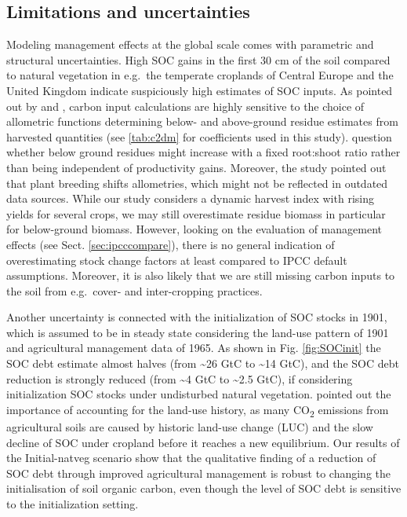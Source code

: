 \documentclass[gc, manuscript]{copernicus}
\begin{document}
\hypertarget{limitations-and-uncertainties}{%
\subsection{Limitations and uncertainties}\label{limitations-and-uncertainties}}

Modeling management effects at the global scale comes with parametric and structural uncertainties. High SOC gains in the first 30 cm of the soil compared to natural vegetation in e.g.~the temperate croplands of Central Europe and the United Kingdom indicate suspiciously high estimates of SOC inputs. As pointed out by \citep{keel_large_2017} and \citep{smith_how_2020}, carbon input calculations are highly sensitive to the choice of allometric functions determining below- and above-ground residue estimates from harvested quantities (see \ref{tab:c2dm} for coefficients used in this study). \citep{keel_large_2017} question whether below ground residues might increase with a fixed root:shoot ratio rather than being independent of productivity gains. Moreover, the study pointed out that plant breeding shifts allometries, which might not be reflected in outdated data sources. While our study considers a dynamic harvest index with rising yields for several crops, we may still overestimate residue biomass in particular for below-ground biomass. However, looking on the evaluation of management effects (see Sect. \ref{sec:ipcccompare}), there is no general indication of overestimating stock change factors at least compared to IPCC default assumptions. Moreover, it is also likely that we are still missing carbon inputs to the soil from e.g.~cover- and inter-cropping practices.

Another uncertainty is connected with the initialization of SOC stocks in 1901, which is assumed to be in steady state considering the land-use pattern of 1901 and agricultural management data of 1965. As shown in Fig. \ref{fig:SOCinit} the SOC debt estimate almost halves (from \textasciitilde26 GtC to \textasciitilde14 GtC), and the SOC debt reduction is strongly reduced (from \textasciitilde4 GtC to \textasciitilde2.5 GtC), if considering initialization SOC stocks under undisturbed natural vegetation. \citep{pugh_simulated_2015} pointed out the importance of accounting for the land-use history, as many CO\textsubscript{2} emissions from agricultural soils are caused by historic land-use change (LUC) and the slow decline of SOC under cropland before it reaches a new equilibrium. Our results of the Initial-natveg scenario show that the qualitative finding of a reduction of SOC debt through improved agricultural management is robust to changing the initialisation of soil organic carbon, even though the level of SOC debt is sensitive to the initialization setting.
\end{document}
